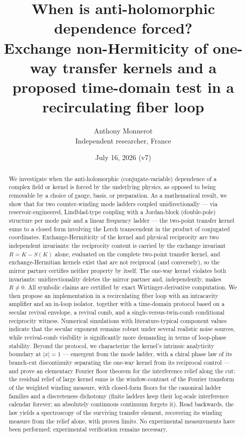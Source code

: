 \documentclass[11pt,a4paper]{article}
\title{\bfseries When is anti-holomorphic dependence forced?\\
Exchange non-Hermiticity of one-way transfer kernels and a proposed
time-domain test in a recirculating fiber loop}
\author{Anthony Monnerot\\ \small Independent researcher, France}
\date{July 16, 2026 (v7)}
\begin{document}
\maketitle

\begin{abstract}
\noindent
We investigate when the anti-holomorphic (conjugate-variable) dependence of a
complex field or kernel is forced by the underlying physics, as opposed to being
removable by a choice of gauge, basis, or preparation. As a mathematical result, we
show that for two counter-winding mode ladders coupled unidirectionally --- via
reservoir-engineered, Lindblad-type coupling with a Jordan-block (double-pole)
structure per mode pair and a linear frequency ladder --- the two-point transfer
kernel sums to a closed form involving the Lerch transcendent in the product of
conjugated coordinates. Exchange-Hermiticity of the kernel and physical reciprocity are two
independent invariants: the reciprocity content is carried by the exchange
invariant $R = K - S(K)$ alone, evaluated on the complete two-point transfer
kernel, and exchange-Hermitian kernels exist that are not reciprocal (and
conversely), so the mirror partner certifies neither property by itself. The
one-way kernel violates both invariants: unidirectionality deletes the mirror
partner and, independently, makes $R \neq 0$. All symbolic claims are certified by exact Wirtinger-derivative
computation. We then propose an implementation in a recirculating fiber loop with
an intracavity amplifier and an in-loop isolator, together with a time-domain
protocol based on a secular revival envelope, a revival comb, and a
single-versus-twin-comb conditional reciprocity witness. Numerical simulations with
literature-typical component values indicate that the secular exponent remains
robust under several realistic noise sources, while revival-comb visibility is
significantly more demanding in terms of loop-phase stability. Beyond the protocol, we characterize the kernel's intrinsic analyticity boundary at $|x| = 1$ --- emergent from the mode ladder, with a chiral phase law of its branch-cut discontinuity separating the one-way kernel from its reciprocal control --- and prove an elementary Fourier floor theorem for the interference relief along the cut: the residual relief of large kernel sums is the window-contrast of the Fourier transform of the weighted winding measure, with closed-form floors for the canonical ladder families and a discreteness dichotomy (finite ladders keep their log-scale interference calendar forever; an absolutely continuous continuum forgets it). Read backwards, the law yields a spectroscopy of the surviving transfer element, recovering its winding measure from the relief alone, with proven limits. No experimental
measurements have been performed; experimental verification remains necessary.
\end{abstract}
\end{document}
